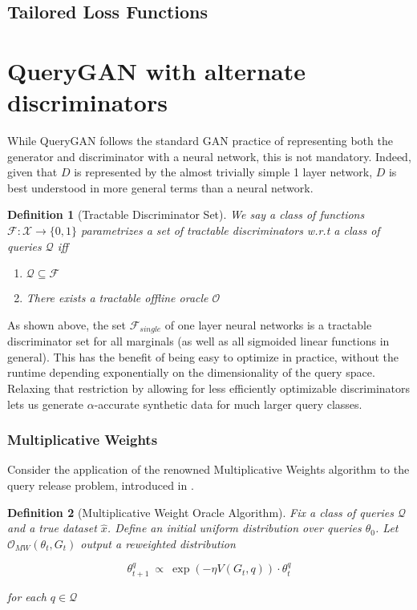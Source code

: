\documentclass[]{article}
\newcommand{\X}{\mathcal{X}}
\newcommand{\Q}{\mathcal{Q}}
\newcommand{\B}{\{0,1\}}
\newtheorem{definition}{Definition}[section]
\theoremstyle{definition}
\begin{document}
\subsection{Tailored Loss Functions}

\section{QueryGAN with alternate discriminators}

While QueryGAN follows the standard GAN practice of representing both the generator and discriminator with a neural network, this is not mandatory. Indeed, given that $D$ is represented by the almost trivially simple 1 layer network, $D$ is best understood in more general terms than a neural network.

\begin{definition}[Tractable Discriminator Set]
    We say a class of functions $\mathcal{F}: \X \to \B$ parametrizes a set of tractable discriminators w.r.t a class of queries $\Q$ iff

    \begin{enumerate}
        \item $\Q \subseteq \mathcal{F}$
        \item There exists a tractable offline oracle $\mathcal{O}$ 
    \end{enumerate}
\end{definition}

As shown above, the set $\mathcal{F}_{single}$ of one layer neural networks is a tractable discriminator set for all marginals (as well as all sigmoided linear functions in general). This has the benefit of being easy to optimize in practice, without the runtime depending exponentially on the dimensionality of the query space. Relaxing that restriction by allowing for less efficiently optimizable discriminators lets us generate $\alpha$-accurate synthetic data for much larger query classes.

\subsubsection{Multiplicative Weights}

Consider the application of the renowned Multiplicative Weights algorithm to the query release problem, introduced in \cite{HR10}. 

\begin{definition}[Multiplicative Weight Oracle Algorithm]
    Fix a class of queries $\mathcal{Q}$ and a true dataset $\hat x$. Define an initial uniform distribution over queries $\theta_0$. Let $\mathcal{O}_{MW}(\theta_t, G_t)$ output a reweighted distribution 

    \begin{equation}
        \theta_{t+1}^q ~ \propto ~ \exp \left(-\eta V(G_t, q)\right) \cdot \theta_{t}^{q}
    \end{equation}

    for each $q \in \mathcal{Q}$
\end{definition}
\end{document}
